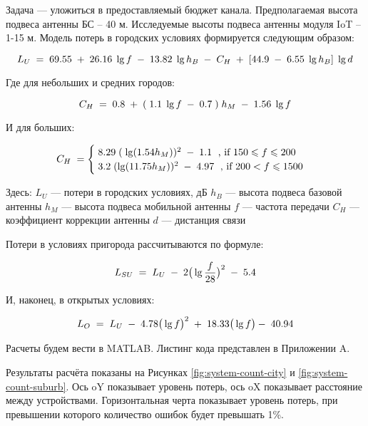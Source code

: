 Задача --- уложиться в предоставляемый бюджет канала. Предполагаемая высота подвеса антенны БС -- 40 м. Исследуемые высоты подвеса антенны модуля IoT -- 1-15 м. Модель потерь в городских условиях формируется следующим образом:

\begin{equation*}
	\centering
	L_U \; = \; 69.55 \; + \; 26.16 \; \lg f \; - \; 13.82 \; \lg h_B \; - \; C_H \; + \; [44.9 \; - \; 6.55 \; \lg h_B] \; \lg d
\end{equation*}

Где для небольших и средних городов:

\begin{equation*}
	\centering
	C_H \; = \; 0.8 \; + \; (\; 1.1 \; \lg f \; - \; 0.7 \; ) \; h_M \; - \; 1.56 \; \lg f 
\end{equation*}

И для больших:

\begin{equation*}
	\centering
	C_H \; = \begin{cases}\;8.29 \; (\; \lg ({1.54 h_M}))^2 \; - \; 1.1 \; \mbox{  , if } 150 \le f \le 200 \\ \; 3.2 \; (\lg ({11.75 h_M}))^2 \; - \; 4.97 \; \mbox{ , if }200 < f \le 1500 \end{cases}
\end{equation*}

Здесь:
$L_U$ — потери в городских условиях, дБ
$h_B$ — высота подвеса базовой антенны
$h_M$ — высота подвеса мобильной антенны
$f$ — частота передачи
$C_H$ — коэффициент коррекции антенны
$d$  — дистанция связи

Потери в условиях пригорода рассчитываются по формуле:

\begin{equation*}
	\centering
	L_{SU}\; = \; L_U \; - \; 2 \big( \lg {\frac{f}{28}}\big)^2 \; - \;5.4 
\end{equation*}

И, наконец, в открытых условиях:

\begin{equation*}
	\centering
	L_{O}\; = \; L_U \; - \; 4.78 \big( \lg {f}\big)^2 \; + \; 18.33 \big( \lg {f}\big)- \;40.94
\end{equation*}
 
Расчеты будем вести в MATLAB. Листинг кода представлен в Приложении A. 

Результаты расчёта показаны на Рисунках \ref{fig:system-count-city} и \ref{fig:system-count-suburb}. Ось oY показывает уровень потерь, ось oX показывает расстояние между устройствами. Горизонтальная черта показывает уровень потерь, при превышении которого количество ошибок будет превышать 1\%.


